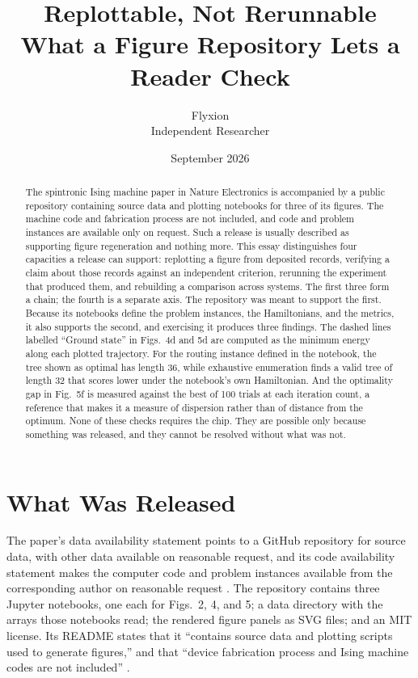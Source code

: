 \documentclass[11pt]{article}
\title{Replottable, Not Rerunnable\\[4pt]
\large What a Figure Repository Lets a Reader Check}
\author{Flyxion\\ Independent Researcher}
\date{September 2026}
\theoremstyle{definition}
\theoremstyle{remark}
\begin{document}
\maketitle

\begin{abstract}
The spintronic Ising machine paper in Nature Electronics is accompanied by a public repository containing source data and plotting notebooks for three of its figures. The machine code and fabrication process are not included, and code and problem instances are available only on request. Such a release is usually described as supporting figure regeneration and nothing more. This essay distinguishes four capacities a release can support: replotting a figure from deposited records, verifying a claim about those records against an independent criterion, rerunning the experiment that produced them, and rebuilding a comparison across systems. The first three form a chain; the fourth is a separate axis. The repository was meant to support the first. Because its notebooks define the problem instances, the Hamiltonians, and the metrics, it also supports the second, and exercising it produces three findings. The dashed lines labelled ``Ground state'' in Figs.~4d and 5d are computed as the minimum energy along each plotted trajectory. For the routing instance defined in the notebook, the tree shown as optimal has length 36, while exhaustive enumeration finds a valid tree of length 32 that scores lower under the notebook's own Hamiltonian. And the optimality gap in Fig.~5f is measured against the best of 100 trials at each iteration count, a reference that makes it a measure of dispersion rather than of distance from the optimum. None of these checks requires the chip. They are possible only because something was released, and they cannot be resolved without what was not.
\end{abstract}

\section{What Was Released}

The paper's data availability statement points to a GitHub repository for source data, with other data available on reasonable request, and its code availability statement makes the computer code and problem instances available from the corresponding author on reasonable request \cite{li2026}. The repository contains three Jupyter notebooks, one each for Figs.~2, 4, and 5; a data directory with the arrays those notebooks read; the rendered figure panels as SVG files; and an MIT license. Its README states that it ``contains source data and plotting scripts used to generate figures,'' and that ``device fabrication process and Ising machine codes are not included'' \cite{vsimrepo}.
\end{document}
